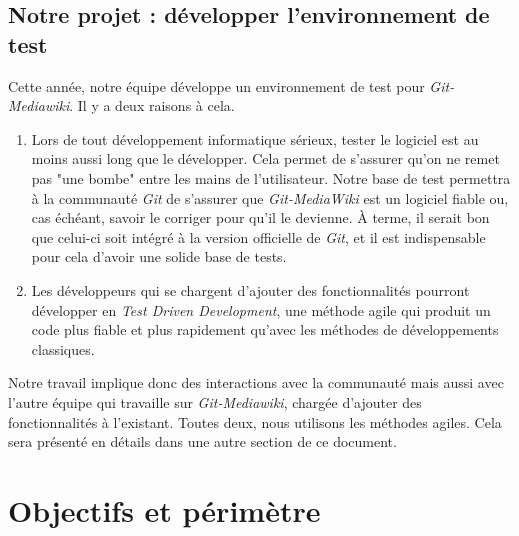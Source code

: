 \documentclass[11pt]{article}
\begin{document}
\subsection{Notre projet : développer l'environnement de test}
Cette année, notre équipe développe un environnement de test pour \textit{Git-Mediawiki}. Il y a deux raisons à cela.
\begin{enumerate}
\item Lors de tout développement informatique sérieux, tester le logiciel est au moins aussi long que le développer. Cela permet de s'assurer qu'on ne remet pas "une bombe" entre les mains de l'utilisateur. Notre base de test permettra à la communauté \textit{Git} de s'assurer que \textit{Git-MediaWiki} est un logiciel fiable ou, cas échéant, savoir le corriger pour qu'il le devienne. À terme, il serait bon que celui-ci soit intégré à la version officielle de \textit{Git}, et il est indispensable pour cela d'avoir une solide base de tests.
\item Les développeurs qui se chargent d'ajouter des fonctionnalités pourront développer en \textit{Test Driven Development}, une méthode agile qui produit un code plus fiable et plus rapidement qu'avec les méthodes de développements classiques.
\end{enumerate}
Notre travail implique donc des interactions avec la communauté mais aussi avec l'autre équipe qui travaille sur \textit{Git-Mediawiki}, chargée d'ajouter des fonctionnalités à l'existant. Toutes deux, nous utilisons les méthodes agiles. Cela sera présenté en détails dans une autre section de ce document.
\newpage
\section{Objectifs et périmètre}
\end{document}
